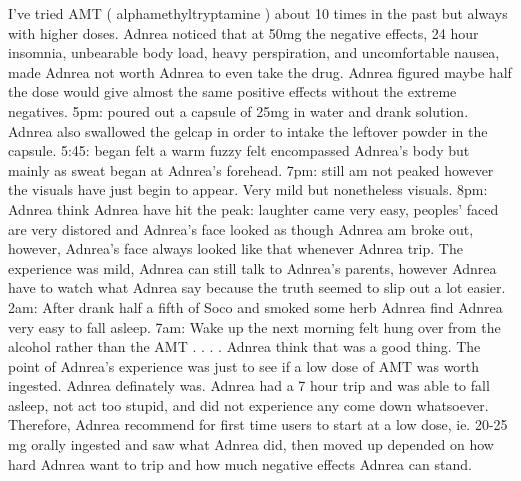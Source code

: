 \documentclass[12pt]{book}
\begin{document}
I've tried AMT ( alphamethyltryptamine ) about 10 times in the past but always with higher doses. Adnrea noticed that at 50mg the negative effects, 24 hour insomnia, unbearable body load, heavy perspiration, and uncomfortable nausea, made Adnrea not worth Adnrea to even take the drug. Adnrea figured maybe half the dose would give almost the same positive effects without the extreme negatives. 5pm: poured out a capsule of 25mg in water and drank solution. Adnrea also swallowed the gelcap in order to intake the leftover powder in the capsule. 5:45: began felt a warm fuzzy felt encompassed Adnrea's body but mainly as sweat began at Adnrea's forehead. 7pm: still am not peaked however the visuals have just begin to appear. Very mild but nonetheless visuals. 8pm: Adnrea think Adnrea have hit the peak: laughter came very easy, peoples' faced are very distored and Adnrea's face looked as though Adnrea am broke out, however, Adnrea's face always looked like that whenever Adnrea trip. The experience was mild, Adnrea can still talk to Adnrea's parents, however Adnrea have to watch what Adnrea say because the truth seemed to slip out a lot easier. 2am: After drank half a fifth of Soco and smoked some herb Adnrea find Adnrea very easy to fall asleep. 7am: Wake up the next morning felt hung over from the alcohol rather than the AMT . . .  . Adnrea think that was a good thing. The point of Adnrea's experience was just to see if a low dose of AMT was worth ingested. Adnrea definately was. Adnrea had a 7 hour trip and was able to fall asleep, not act too stupid, and did not experience any come down whatsoever. Therefore, Adnrea recommend for first time users to start at a low dose, ie. 20-25 mg orally ingested and saw what Adnrea did, then moved up depended on how hard Adnrea want to trip and how much negative effects Adnrea can stand.
\end{document}
